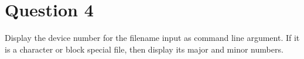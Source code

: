 \documentclass[main.tex]{subfiles}
\begin{document}
\section{Question 4}

Display the device number for the filename input as command line argument. If it
is a character or block special file, then display its major and minor numbers.



\end{document}
